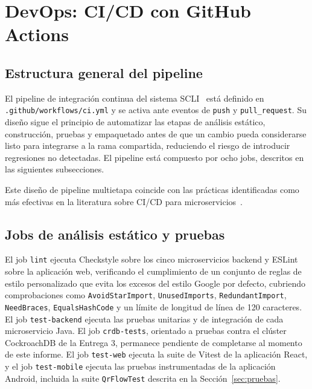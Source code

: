 \documentclass[11pt,a4paper]{article}
\begin{document}
\section{DevOps: CI/CD con GitHub Actions}
\label{sec:cicd}

\subsection{Estructura general del pipeline}

El pipeline de integración continua del sistema
SCLI~\cite{humble2010continuous,kim2021devops} está definido en
\texttt{.github/workflows/ci.yml} y se activa ante eventos de
\texttt{push} y \texttt{pull\_request}. Su diseño sigue el principio de
automatizar las etapas de análisis estático, construcción, pruebas y
empaquetado antes de que un cambio pueda considerarse listo para
integrarse a la rama compartida, reduciendo el riesgo de introducir
regresiones no detectadas. El pipeline está compuesto por ocho jobs,
descritos en las siguientes subsecciones.

Este diseño de pipeline multietapa coincide con las prácticas
identificadas como más efectivas en la literatura sobre CI/CD para
microservicios~\cite{shahin2017continuous,pratama2021implementation,thallapally2021implementing}.

\subsection{Jobs de análisis estático y pruebas}

El job \texttt{lint} ejecuta Checkstyle sobre los cinco microservicios
backend y ESLint sobre la aplicación web, verificando el cumplimiento de
un conjunto de reglas de estilo personalizado que evita los excesos del
estilo Google por defecto, cubriendo comprobaciones como
\texttt{AvoidStarImport}, \texttt{UnusedImports},
\texttt{RedundantImport}, \texttt{NeedBraces}, \texttt{EqualsHashCode} y
un límite de longitud de línea de 120 caracteres. El job
\texttt{test-backend} ejecuta las pruebas unitarias y de integración de
cada microservicio Java. El job \texttt{crdb-tests}, orientado a
pruebas contra el clúster CockroachDB de la Entrega 3, permanece
pendiente de completarse al momento de este informe. El job
\texttt{test-web} ejecuta la suite de Vitest de la aplicación React, y
el job \texttt{test-mobile} ejecuta las pruebas instrumentadas de la
aplicación Android, incluida la suite \texttt{QrFlowTest} descrita en
la Sección~\ref{sec:pruebas}.
\end{document}
